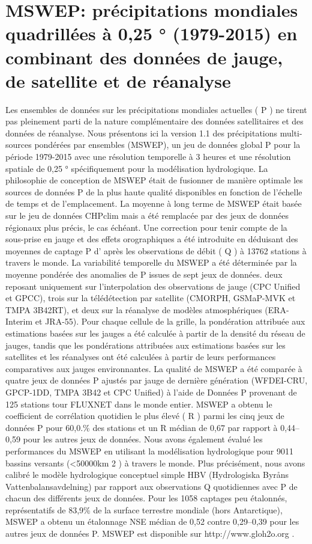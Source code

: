 \section{MSWEP: précipitations mondiales quadrillées à 0,25 ° (1979-2015) en combinant des données de jauge, de satellite et de réanalyse}
 Les ensembles de données sur les précipitations mondiales actuelles ( P ) ne tirent pas pleinement parti de la nature complémentaire des données satellitaires et des données de réanalyse. Nous présentons ici la version 1.1 des précipitations multi-sources pondérées par ensembles (MSWEP), un jeu de données global P pour la période 1979-2015 avec une résolution temporelle à 3 heures et une résolution spatiale de 0,25 ° spécifiquement pour la modélisation hydrologique. La philosophie de conception de MSWEP était de fusionner de manière optimale les  sources de données P de la plus haute qualité disponibles en fonction de l’échelle de temps et de l’emplacement. La moyenne à long terme de MSWEP était basée sur le jeu de données CHPclim mais a été remplacée par des jeux de données régionaux plus précis, le cas échéant. Une correction pour tenir compte de la sous-prise en jauge et des effets orographiques a été introduite en déduisant des moyennes de captage P d' après les observations de débit ( Q ) à 13762 stations à travers le monde. La variabilité temporelle du MSWEP a été déterminée par la moyenne pondérée des  anomalies de P issues de sept jeux de données. deux reposant uniquement sur l'interpolation des observations de jauge (CPC Unified et GPCC), trois sur la télédétection par satellite (CMORPH, GSMaP-MVK et TMPA 3B42RT), et deux sur la réanalyse de modèles atmosphériques (ERA-Interim et JRA-55). Pour chaque cellule de la grille, la pondération attribuée aux estimations basées sur les jauges a été calculée à partir de la densité du réseau de jauges, tandis que les pondérations attribuées aux estimations basées sur les satellites et les réanalyses ont été calculées à partir de leurs performances comparatives aux jauges environnantes. La qualité de MSWEP a été comparée à quatre  jeux de données P ajustés par jauge de dernière génération (WFDEI-CRU, GPCP-1DD, TMPA 3B42 et CPC Unified) à l’aide de Données P provenant de 125 stations tour FLUXNET dans le monde entier. MSWEP a obtenu le coefficient de corrélation quotidien le plus élevé ( R ) parmi les cinq  jeux de données P pour 60,0.\% des stations et un R médian  de 0,67 par rapport à 0,44–0,59 pour les autres jeux de données. Nous avons également évalué les performances du MSWEP en utilisant la modélisation hydrologique pour 9011 bassins versants (<50000km 2 ) à travers le monde. Plus précisément, nous avons calibré le modèle hydrologique conceptuel simple HBV (Hydrologiska Byråns Vattenbalansavdelning) par rapport aux observations Q quotidiennes  avec  P de chacun des différents jeux de données. Pour les 1058 captages peu étalonnés, représentatifs de 83,9\% de la surface terrestre mondiale (hors Antarctique), MSWEP a obtenu un étalonnage NSE médian de 0,52 contre 0,29–0,39 pour les autres  jeux de données P. MSWEP est disponible sur http://www.gloh2o.org . \cite{beck_mswep:_2017}
